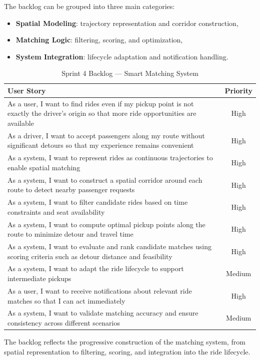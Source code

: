 The backlog can be grouped into three main categories:

\begin{itemize}
    \item \textbf{Spatial Modeling}: trajectory representation and corridor construction,
    \item \textbf{Matching Logic}: filtering, scoring, and optimization,
    \item \textbf{System Integration}: lifecycle adaptation and notification handling.
\end{itemize}
\begin{table}[H]
\centering
\renewcommand{\arraystretch}{1.4}
\setlength{\tabcolsep}{6pt}
\begin{tabular}{|p{10cm}|c|}
\hline
\textbf{User Story} & \textbf{Priority} \\
\hline
As a user, I want to find rides even if my pickup point is not exactly the driver's origin so that more ride opportunities are available & High \\
\hline
As a driver, I want to accept passengers along my route without significant detours so that my experience remains convenient & High \\
\hline
As a system, I want to represent rides as continuous trajectories to enable spatial matching & High \\
\hline
As a system, I want to construct a spatial corridor around each route to detect nearby passenger requests & High \\
\hline
As a system, I want to filter candidate rides based on time constraints and seat availability & High \\
\hline
As a system, I want to compute optimal pickup points along the route to minimize detour and travel time & High \\
\hline
As a system, I want to evaluate and rank candidate matches using scoring criteria such as detour distance and feasibility & High \\
\hline
As a system, I want to adapt the ride lifecycle to support intermediate pickups & Medium \\
\hline
As a user, I want to receive notifications about relevant ride matches so that I can act immediately & High \\
\hline
As a system, I want to validate matching accuracy and ensure consistency across different scenarios & Medium \\
\hline
\end{tabular}
\caption{Sprint 4 Backlog — Smart Matching System}
\end{table}
The backlog reflects the progressive construction of the matching system, from spatial representation to filtering, scoring, and integration into the ride lifecycle.

